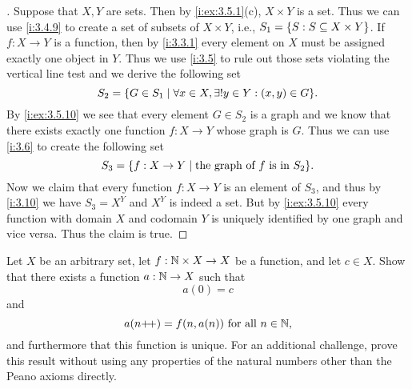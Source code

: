 \begin{proof}[]
  Suppose that \(X, Y\) are sets.
  Then by \cref{i:ex:3.5.1}(c), \(X \times Y\) is a set.
  Thus we can use \cref{i:3.4.9} to create a set of subsets of \(X \times Y\), i.e., \(S_1 = \left\lbrace S : S \subseteq X \times Y\right\rbrace\).
  If \(f : X \to Y\) is a function, then by \cref{i:3.3.1} every element on \(X\) must be assigned exactly one object in \(Y\).
  Thus we use \cref{i:3.5} to rule out those sets violating the vertical line test and we derive the following set
  \[
    S_2 = \set{G \in S_1 \mid \forall x \in X, \exists! y \in Y : (x, y) \in G}.
  \]
  By \cref{i:ex:3.5.10} we see that every element \(G \in S_2\) is a graph and we know that there exists exactly one function \(f : X \to Y\) whose graph is \(G\).
  Thus we can use \cref{i:3.6} to create the following set
  \[
    S_3 = \set{f : X \to Y \mid \text{the graph of } f \text{ is in } S_2}.
  \]
  Now we claim that every function \(f : X \to Y\) is an element of \(S_3\), and thus by \cref{i:3.10} we have \(S_3 = X^Y\) and \(X^Y\) is indeed a set.
  But by \cref{i:ex:3.5.10} every function with domain \(X\) and codomain \(Y\) is uniquely identified by one graph and vice versa.
  Thus the claim is true.
\end{proof}

\begin{ex}\label{i:ex:3.5.12}
  Let \(X\) be an arbitrary set, let \(f : \mathbb{N} \times X \to X\) be a function, and let \(c \in X\).
  Show that there exists a function \(a : \mathbb{N} \to X\) such that
  \[
    a(0) = c
  \]
  and
  \[
    a(n{+}\!{+}) = f(n, a(n)) \text{ for all } n \in \mathbb{N},
  \]
  and furthermore that this function is unique.
  For an additional challenge, prove this result without using any properties of the natural numbers other than the Peano axioms directly.
\end{ex}


